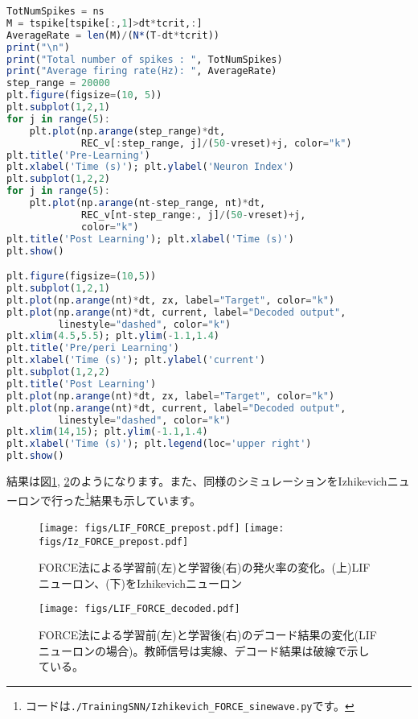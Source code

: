 \begin{lstlisting}[language=julia]
TotNumSpikes = ns 
M = tspike[tspike[:,1]>dt*tcrit,:]
AverageRate = len(M)/(N*(T-dt*tcrit))
print("\n")
print("Total number of spikes : ", TotNumSpikes)
print("Average firing rate(Hz): ", AverageRate)
step_range = 20000
plt.figure(figsize=(10, 5))
plt.subplot(1,2,1)
for j in range(5):
    plt.plot(np.arange(step_range)*dt,
             REC_v[:step_range, j]/(50-vreset)+j, color="k")
plt.title('Pre-Learning')
plt.xlabel('Time (s)'); plt.ylabel('Neuron Index') 
plt.subplot(1,2,2)
for j in range(5):
    plt.plot(np.arange(nt-step_range, nt)*dt,
             REC_v[nt-step_range:, j]/(50-vreset)+j,
             color="k")
plt.title('Post Learning'); plt.xlabel('Time (s)')
plt.show()

plt.figure(figsize=(10,5))
plt.subplot(1,2,1)
plt.plot(np.arange(nt)*dt, zx, label="Target", color="k")
plt.plot(np.arange(nt)*dt, current, label="Decoded output",
         linestyle="dashed", color="k")
plt.xlim(4.5,5.5); plt.ylim(-1.1,1.4)
plt.title('Pre/peri Learning')
plt.xlabel('Time (s)'); plt.ylabel('current') 
plt.subplot(1,2,2)
plt.title('Post Learning')
plt.plot(np.arange(nt)*dt, zx, label="Target", color="k")
plt.plot(np.arange(nt)*dt, current, label="Decoded output",
         linestyle="dashed", color="k")
plt.xlim(14,15); plt.ylim(-1.1,1.4)
plt.xlabel('Time (s)'); plt.legend(loc='upper right')
plt.show()
\end{lstlisting}
結果は図\ref{fig:LIF_FORCE_1}, \ref{fig:LIF_FORCE_2}のようになります。また、同様のシミュレーションをIzhikevichニューロンで行った\footnote{コードは\texttt{./TrainingSNN/Izhikevich\_FORCE\_sinewave.py}です。}結果も示しています。
\begin{figure}[htbp]
    \centering
    \texttt{[image: figs/LIF\_FORCE\_prepost.pdf]}
    \texttt{[image: figs/Iz\_FORCE\_prepost.pdf]}
    \caption{FORCE法による学習前(左)と学習後(右)の発火率の変化。(上)LIFニューロン、(下)をIzhikevichニューロン}
    \label{fig:LIF_FORCE_1}
\end{figure}
\begin{figure}[H]
    \centering
    \texttt{[image: figs/LIF\_FORCE\_decoded.pdf]}
    \caption{FORCE法による学習前(左)と学習後(右)のデコード結果の変化(LIFニューロンの場合)。教師信号は実線、デコード結果は破線で示している。}
    \label{fig:LIF_FORCE_2}
\end{figure}
